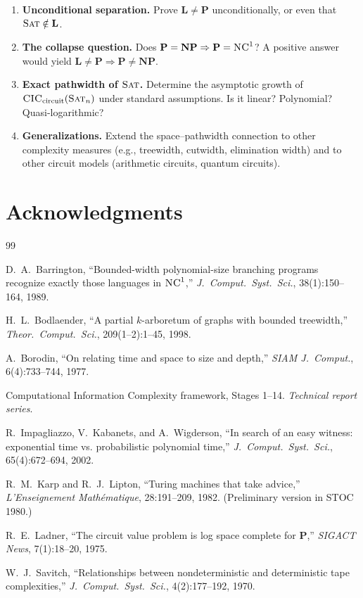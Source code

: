 \documentclass[11pt]{article}
\newcommand{\SAT}{\textsc{Sat}}
\newcommand{\CIC}{\textsc{CIC}}
\newcommand{\NC}{\textsc{NC}}
\begin{document}
\begin{enumerate}
  \item \textbf{Unconditional separation.}  Prove $\mathbf{L} \neq \mathbf{P}$
    unconditionally, or even that $\SAT \notin \mathbf{L}$.
  \item \textbf{The collapse question.}  Does
    $\mathbf{P} = \mathbf{NP} \Rightarrow \mathbf{P} = \NC^1$?
    A positive answer would yield
    $\mathbf{L} \neq \mathbf{P} \Rightarrow \mathbf{P} \neq \mathbf{NP}$.
  \item \textbf{Exact pathwidth of $\SAT$.}  Determine the asymptotic growth
    of $\CIC_{\text{circuit}}(\SAT_n)$ under standard assumptions.  Is it
    linear?  Polynomial?  Quasi-logarithmic?
  \item \textbf{Generalizations.}  Extend the space--pathwidth connection to
    other complexity measures (e.g., treewidth, cutwidth, elimination width)
    and to other circuit models (arithmetic circuits, quantum circuits).
\end{enumerate}

\section*{Acknowledgments}

\begin{thebibliography}{99}

D.~A.~Barrington,
``Bounded-width polynomial-size branching programs recognize exactly those
languages in $\NC^1$,''
\emph{J.~Comput.~Syst.~Sci.}, 38(1):150--164, 1989.

H.~L.~Bodlaender,
``A partial $k$-arboretum of graphs with bounded treewidth,''
\emph{Theor.~Comput.~Sci.}, 209(1--2):1--45, 1998.

A.~Borodin,
``On relating time and space to size and depth,''
\emph{SIAM J.~Comput.}, 6(4):733--744, 1977.

Computational Information Complexity framework, Stages 1--14.
\emph{Technical report series}.

R.~Impagliazzo, V.~Kabanets, and A.~Wigderson,
``In search of an easy witness: exponential time vs. probabilistic
polynomial time,''
\emph{J.~Comput.~Syst.~Sci.}, 65(4):672--694, 2002.

R.~M.~Karp and R.~J.~Lipton,
``Turing machines that take advice,''
\emph{L'Enseignement Math\'{e}matique}, 28:191--209, 1982.
(Preliminary version in STOC 1980.)

R.~E.~Ladner,
``The circuit value problem is log space complete for $\mathbf{P}$,''
\emph{SIGACT News}, 7(1):18--20, 1975.

W.~J.~Savitch,
``Relationships between nondeterministic and deterministic tape complexities,''
\emph{J.~Comput.~Syst.~Sci.}, 4(2):177--192, 1970.

\end{thebibliography}
\end{document}
